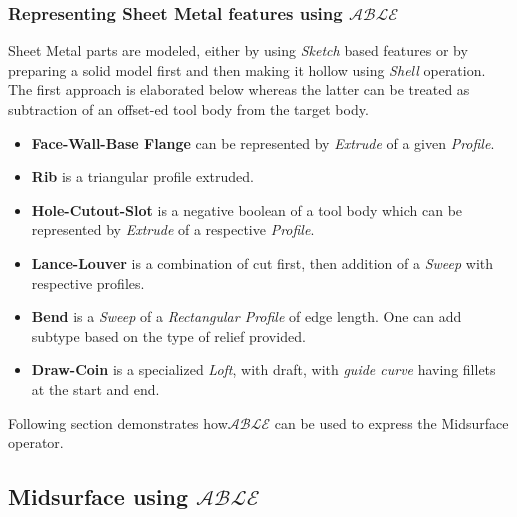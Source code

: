 \subsubsection{Representing Sheet Metal features using  $\mathcal{ABLE}$}
Sheet Metal parts are modeled, either by using {\em Sketch} based features or by preparing a solid model first and then making it hollow using {\em Shell} operation. The first approach is elaborated below whereas the latter can be treated as subtraction of an offset-ed tool body from the target body. 
\begin{itemize}[noitemsep,topsep=2pt,parsep=2pt,partopsep=2pt,label={},leftmargin=*]
\item {\bf Face-Wall-Base Flange} can be represented by {\em Extrude} of a given {\em Profile}.
\item {\bf Rib} is a triangular profile extruded.
\item {\bf Hole-Cutout-Slot} is a negative boolean of a tool body which can be represented by  {\em Extrude} of a respective {\em Profile}.
\item {\bf Lance-Louver} is a combination of cut first, then addition of a {\em Sweep} with respective profiles. 
\item {\bf Bend} is a {\em Sweep} of a {\em Rectangular  Profile}	 of edge length. One can add subtype based on the type of relief provided.
\item {\bf Draw-Coin} is a specialized {\em Loft}, with draft, with {\em guide curve} having fillets at the start and end.
\end{itemize}


Following section demonstrates how{\bf $\mathcal{ABLE}$} can be used to express the Midsurface operator.

\subsection{Midsurface using $\mathcal{ABLE}$}


